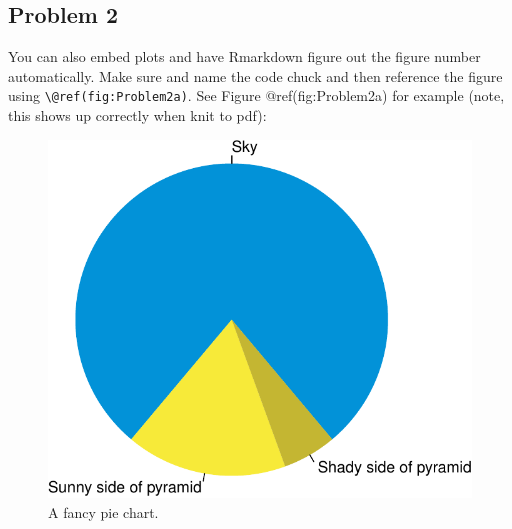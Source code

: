 \documentclass[]{article}
\newenvironment{Shaded}{\begin{snugshade}}{\end{snugshade}}
\newcommand{\CommentTok}[1]{\textcolor[rgb]{0.56,0.35,0.01}{\textit{#1}}}
\newcommand{\DataTypeTok}[1]{\textcolor[rgb]{0.13,0.29,0.53}{#1}}
\newcommand{\DecValTok}[1]{\textcolor[rgb]{0.00,0.00,0.81}{#1}}
\newcommand{\KeywordTok}[1]{\textcolor[rgb]{0.13,0.29,0.53}{\textbf{#1}}}
\newcommand{\NormalTok}[1]{#1}
\newcommand{\OtherTok}[1]{\textcolor[rgb]{0.56,0.35,0.01}{#1}}
\newcommand{\StringTok}[1]{\textcolor[rgb]{0.31,0.60,0.02}{#1}}
\begin{document}
\hypertarget{problem-2}{%
\subsection{Problem 2}\label{problem-2}}

You can also embed plots and have Rmarkdown figure out the figure number
automatically. Make sure and name the code chuck and then reference the
figure using \texttt{\textbackslash{}@ref(fig:Problem2a)}. See Figure
@ref(fig:Problem2a) for example (note, this shows up correctly when knit
to pdf):

\begin{Shaded}
\end{Shaded}

\begin{figure}
\centering
\includegraphics{SampleHomework_files/figure-latex/Problem2a-1.pdf}
\caption{A fancy pie chart.}
\end{figure}
\end{document}
